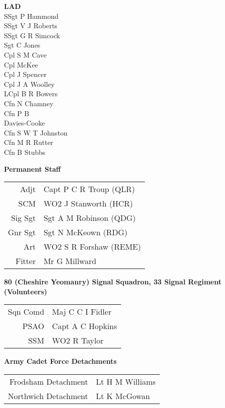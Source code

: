 \begin{multicols}{4}
  \textbf{LAD} \\
  SSgt P Hammond \\
  SSgt V J Roberts \\
  SSgt G R Simcock \\
  Sgt C Jones \\
  Cpl S M Cave \\
  Cpl McKee \\
  Cpl J Spencer \\
  Cpl J A Woolley \\
  LCpl B R Bowers \\
  Cfn N Chamney \\
  Cfn P B \\ \indent Davies-Cooke \\
  Cfn S W T Johnston \\
  Cfn M R Rutter \\
  Cfn B Stubbs \\
\end{multicols}

\pagebreak

\vspace*{20mm}

\begin{center}
  \Large
  \textbf{Permanent Staff}
\end{center}

\begin{center}
  \small
  \begin{tabular}{rl}
    Adjt & Capt P C R Troup (QLR) \\
    SCM & WO2 J Stanworth (HCR) \\
    Sig Sgt & Sgt A M Robinson (QDG) \\
    Gnr Sgt & Sgt N McKeown (RDG) \\
    Art & WO2 S R Forshaw (REME) \\
    Fitter & Mr G Millward \\
  \end{tabular}
\end{center}

\vspace*{20mm}

\begin{center}
  \Large
  \textbf{80 (Cheshire Yeomanry) Signal Squadron, 33 Signal Regiment (Volunteers)}
\end{center}

\begin{center}
  \begin{tabular}{rl}
    Sqn Comd & Maj C C I Fidler \\
    PSAO & Capt A C Hopkins \\
    SSM & WO2 R Taylor \\
  \end{tabular}
\end{center}

\vspace*{20mm}

\begin{center}
  \Large
  \textbf{Army Cadet Force Detachments}
\end{center}

\begin{center}
  \begin{tabular}{rl}
    Frodsham Detachment & Lt H M Williams \\
    Northwich Detachment & Lt K McGowan \\
  \end{tabular}
\end{center}
